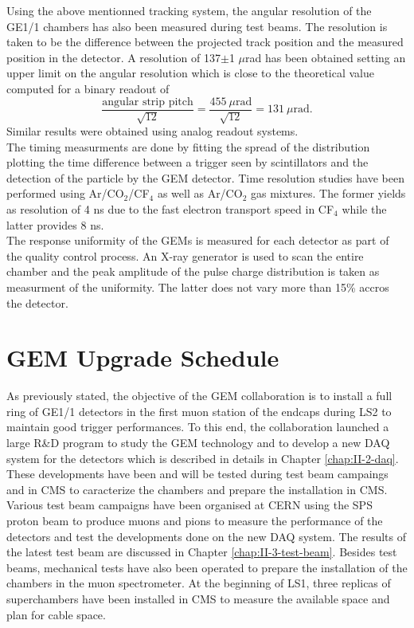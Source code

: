    Using the above mentionned tracking system, the angular resolution of the GE1/1 chambers has also been measured during test beams. The resolution is taken to be the difference between the projected track position and the measured position in the detector. A resolution of 137$\pm$1 $\mu$rad has been obtained setting an upper limit on the angular resolution which is close to the theoretical value computed for a binary readout of
    \begin{equation}
      \frac{\text{angular strip pitch}}{\sqrt{12}} = \frac{455\  \mu\text{rad}}{\sqrt{12}} = 131\ \mu\text{rad} .
    \end{equation}
    Similar results were obtained using analog readout systems. \\

    The timing measurments are done by fitting the spread of the distribution plotting the time difference between a trigger seen by scintillators and the detection of the particle by the GEM detector. Time resolution studies have been performed using Ar/CO$_2$/CF$_4$ as well as Ar/CO$_2$ gas mixtures. The former yields as resolution of 4 ns due to the fast electron transport speed in CF$_4$ while the latter provides 8 ns. \\

    The response uniformity of the GEMs is measured for each detector as part of the quality control process. An X-ray generator is used to scan the entire chamber and the peak amplitude of the pulse charge distribution is taken as measurment of the uniformity. The latter does not vary more than 15\% accros the detector.

  \section{GEM Upgrade Schedule}

    As previously stated, the objective of the GEM collaboration is to install a full ring of GE1/1 detectors in the first muon station of the endcaps during LS2 to maintain good trigger performances. To this end, the collaboration launched a large R\&D program to study the GEM technology and to develop a new DAQ system for the detectors which is described in details in Chapter \ref{chap:II-2-daq}. These developments have been and will be tested during test beam campaings and in CMS to caracterize the chambers and prepare the installation in CMS. \\

    Various test beam campaigns have been organised at CERN using the SPS proton beam to produce muons and pions to measure the performance of the detectors and test the developments done on the new DAQ system. The results of the latest test beam are discussed in Chapter \ref{chap:II-3-test-beam}. Besides test beams, mechanical tests have also been operated to prepare the installation of the chambers in the muon spectrometer. At the beginning of LS1, three replicas of superchambers have been installed in CMS to measure the available space and plan for cable space. \\


